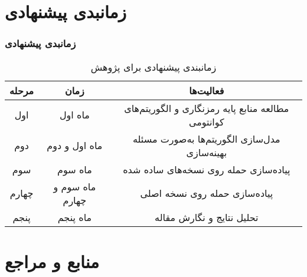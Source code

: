 \documentclass[xcolor=dvipsnames, professionalfonts, aspectratio=169, 11pt]{beamer}
\begin{document}
\section{زمانبدی پیشنهادی}
\begin{frame}
    \frametitle{زمانبدی پیشنهادی}
    \begin{table}
        \caption{زمانبندی پیشنهادى براى پژوهش}
        \vspace{-1em}
        \small
        \begin{tabular}{|c|c|c|}
            \hline
            \textbf{مرحله} & \textbf{زمان} & \textbf{فعالیت‌ها} \\
            \hline
            اول & ماه اول & مطالعه منابع پایه رمزنگارى و الگوریتم‌هاى کوانتومى \\
            \hline
            دوم & ماه اول و دوم & مدل‌سازى الگوریتم‌ها به‌صورت مسئله بهینه‌سازى \\
            \hline
            سوم & ماه سوم & پیاده‌سازى حمله روى نسخه‌هاى ساده شده \\
            \hline
            چهارم & ماه سوم و چهارم & پیاده‌سازى حمله روى نسخه اصلى \\
            \hline
            پنجم & ماه پنجم & تحلیل نتایج و نگارش مقاله \\
            \hline
        \end{tabular}
    \end{table}
\end{frame}

\section{منابع و مراجع}
\begin{frame}
    \begin{latin}
        \scriptsize
        
    \end{latin}

\end{frame}
\end{document}
